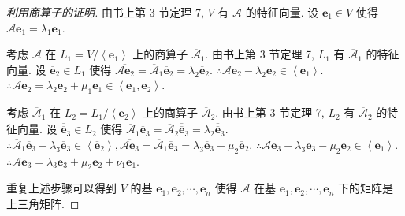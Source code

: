 \documentclass[color=black,device=normal,lang=cn,mode=geye]{elegantnote}
\begin{document}
\begin{proof}[利用商算子的证明]
    由书上第 3 节定理 7, $V$ 有 $\mathcal{A}$ 的特征向量. 设 $\boldsymbol{e}_1\in V$ 使得 $\mathcal{A}\boldsymbol{e}_1=\lambda_1\boldsymbol{e}_1$.

    考虑 $\mathcal{A}$ 在 $L_1=V/\left<\boldsymbol{e}_1\right>$ 上的商算子 $\overline{\mathcal{A}}_1$. 由书上第 3 节定理 7, $L_1$ 有 $\overline{\mathcal{A}}_1$ 的特征向量. 设 $\overline{\boldsymbol{e}}_2\in L_1$ 使得 $\overline{\mathcal{A}\boldsymbol{e}_2}=\overline{\mathcal{A}}_1\overline{\boldsymbol{e}}_2=\lambda_2\overline{\boldsymbol{e}}_2$. $\therefore\mathcal{A}\boldsymbol{e}_2-\lambda_2\boldsymbol{e}_2\in\left<\boldsymbol{e}_1\right>$. $\therefore\mathcal{A}\boldsymbol{e}_2=\lambda_2\boldsymbol{e}_2+\mu_1\boldsymbol{e}_1\in\left<\boldsymbol{e}_1,\boldsymbol{e}_2\right>$.

    考虑 $\overline{\mathcal{A}}_1$ 在 $L_2=L_1/\left<\overline{\boldsymbol{e}}_2\right>$ 上的商算子 $\overline{\mathcal{A}}_2$. 由书上第 3 节定理 7, $L_2$ 有 $\overline{\mathcal{A}}_2$ 的特征向量. 设 $\overline{\overline{\boldsymbol{e}}}_3\in L_2$ 使得 $\overline{\overline{\mathcal{A}}_1\overline{\boldsymbol{e}}_3}=\overline{\mathcal{A}}_2\overline{\overline{\boldsymbol{e}}}_3=\lambda_2\overline{\overline{\boldsymbol{e}}}_3$. $\therefore\overline{\mathcal{A}}_1\overline{\boldsymbol{e}}_3-\lambda_3\overline{\boldsymbol{e}}_3\in\left<\overline{\boldsymbol{e}}_2\right>,\overline{\mathcal{A}\boldsymbol{e}_3}=\overline{\mathcal{A}}_1\overline{\boldsymbol{e}}_3=\lambda_3\overline{\boldsymbol{e}}_3+\mu_2\overline{\boldsymbol{e}}_2$. $\therefore\mathcal{A}\boldsymbol{e}_3-\lambda_3\boldsymbol{e}_3-\mu_2\boldsymbol{e}_2\in\left<\boldsymbol{e}_1\right>$. $\therefore\mathcal{A}\boldsymbol{e}_3=\lambda_3\boldsymbol{e}_3+\mu_2\boldsymbol{e}_2+\nu_1\boldsymbol{e}_1$.

    重复上述步骤可以得到 $V$ 的基 $\boldsymbol{e}_1,\boldsymbol{e}_2,\cdots,\boldsymbol{e}_n$ 使得 $\mathcal{A}$ 在基 $\boldsymbol{e}_1,\boldsymbol{e}_2,\cdots,\boldsymbol{e}_n$ 下的矩阵是上三角矩阵.
\end{proof}
\end{document}
